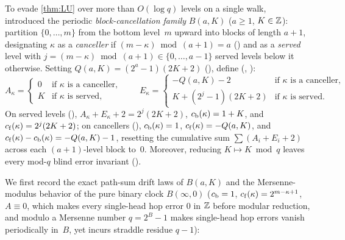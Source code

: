 To evade \cref{thm:LU} over more than $O(\log q)$ levels on a single walk,~\cite[Section~5.3]{EighthPaper2026} introduced
the periodic \emph{block-cancellation family} $B(a, K)$ ($a \ge 1$, $K \in \mathbb{Z}$): partition $\{0, \dots, m\}$ from the bottom
level~$m$ upward into blocks of length $a + 1$, designating $\kappa$ as a \emph{canceller} if $(m - \kappa) \bmod (a + 1)
= a$ () and as a \emph{served} level with $j = (m - \kappa) \bmod (a + 1) \in \{0, \dots, a-1\}$ served
levels below it otherwise. Setting $Q(a, K) = (2^a - 1)(2K + 2)$ (), define (, ):
\[
  A_\kappa = \begin{cases} 0 & \text{if }\kappa\text{ is a canceller},\\ K & \text{if }\kappa\text{ is served},\end{cases}
  \qquad
  E_\kappa = \begin{cases} -Q(a, K) - 2 & \text{if }\kappa\text{ is a canceller},\\
    K + (2^j - 1)(2K + 2) & \text{if }\kappa\text{ is served.}\end{cases}
\]
On served levels (), $A_\kappa + E_\kappa + 2 = 2^j(2K + 2)$, $c_{\mathrm{b}}(\kappa) = 1 + K$, and
$c_{\mathrm{f}}(\kappa) = 2^j(2K + 2)$; on cancellers (), $c_{\mathrm{b}}(\kappa) = 1$, $c_{\mathrm{f}}(\kappa)
= -Q(a, K)$, and $c_{\mathrm{f}}(\kappa) - c_{\mathrm{b}}(\kappa) = -Q(a, K) - 1$, resetting the cumulative sum $\sum (A_i + E_i + 2)$
across each $(a+1)$-level block to~$0$. Moreover, reducing $K \mapsto K \bmod q$ leaves every mod-$q$ blind error invariant
().

We first record the exact path-sum drift laws of $B(a, K)$ and the Mersenne-modulus behavior of the pure binary clock
$B(\infty, 0)$ ($c_{\mathrm{b}} = 1$, $c_{\mathrm{f}}(\kappa) = 2^{m - \kappa + 1}$, $A \equiv 0$, which makes every single-head hop
error $0$ in $\mathbb{Z}$ before modular reduction, and modulo a Mersenne number $q = 2^B - 1$ makes single-head hop errors vanish
periodically in~$B$, yet incurs straddle residue $q - 1$):

